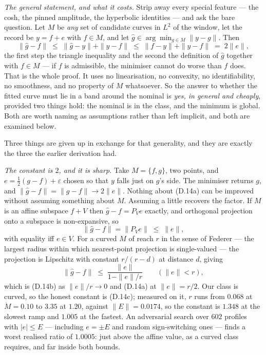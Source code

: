 \documentclass[11pt]{article}
\begin{document}
\emph{The general statement, and what it costs.} Strip away every
special feature --- the cosh, the pinned amplitude, the hyperbolic
identities --- and ask the bare question. Let $M$ be \emph{any} set of
candidate curves in $L^2$ of the window, let the record be
$y = f + e$ with $f \in M$, and let
$\hat g \in \arg\min_{g\in M}\|y-g\|$. Then
\begin{equation}
  \|\hat g - f\| \;\le\; \|\hat g - y\| + \|y - f\|
                 \;\le\; \|f - y\| + \|y - f\|
                 \;=\; 2\|e\| ,
  \tag{D.14a}
\end{equation}
the first step the triangle inequality and the second the definition of
$\hat g$ together with $f \in M$ --- if $f$ is admissible, the minimiser
cannot do worse than $f$ does. That is the whole proof. It uses no
linearisation, no convexity, no identifiability, no smoothness, and no
property of $M$ whatsoever. So the answer to whether the fitted curve
must lie in a band around the nominal is \emph{yes, in general and
cheaply}, provided two things hold: the nominal is in the class, and the
minimum is global. Both are worth naming as assumptions rather than
left implicit, and both are examined below.

Three things are given up in exchange for that generality, and they are
exactly the three the earlier derivation had.

\emph{The constant is $2$, and it is sharp.} Take $M = \{f, g\}$, two
points, and $e = \tfrac12(g-f) + \varepsilon$ chosen so that $y$ falls
just on $g$'s side. The minimiser returns $g$, and
$\|\hat g - f\| = \|g-f\| \to 2\|e\|$. Nothing about (D.14a) can be
improved without assuming something about $M$. Assuming a little
recovers the factor. If $M$ is an affine subspace $f + V$ then
$\hat g - f = P_V e$ exactly, and orthogonal projection onto a subspace
is non-expansive, so
\begin{equation}
  \|\hat g - f\| = \|P_V e\| \;\le\; \|e\| ,
  \tag{D.14b}
\end{equation}
with equality iff $e \in V$. For a curved $M$ of reach $r$ in the sense
of Federer --- the largest radius within which nearest-point projection
is single-valued --- the projection is Lipschitz with constant
$r/(r-d)$ at distance $d$, giving
\begin{equation}
  \|\hat g - f\| \;\le\; \frac{\|e\|}{1 - \|e\|/r}
  \qquad (\|e\| < r),
  \tag{D.14c}
\end{equation}
which is (D.14b) as $\|e\|/r\to0$ and (D.14a) at $\|e\| = r/2$. Our
class is curved, so the honest constant is (D.14c); measured on it,
$r$ runs from $0.068$ at $\dot M = 0.10$ to $3.35$ at $1.20$, against
$\|E\| = 0.0174$, so the constant is $1.348$ at the slowest ramp and
$1.005$ at the fastest. An adversarial search over $602$ profiles with
$|e|\le E$ --- including $e = \pm E$ and random sign-switching ones ---
finds a worst realised ratio of $1.0005$: just above the affine value,
as a curved class requires, and far inside both bounds.
\end{document}
